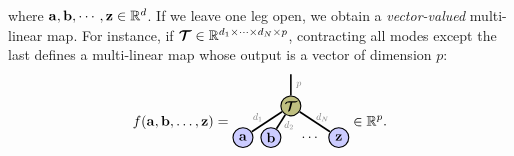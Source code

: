 where $\ab, \bb,\cdots,\zb\in\RR^d$.
If we leave one leg open, we obtain a \emph{vector-valued} multi-linear map. For instance, if $\Tt\in\RR^{d_1\times\cdots\times d_N \times p}$, contracting all modes except the last defines a multi-linear map whose output is a vector of dimension $p$:
$$
f(\ab,\bb,\dots,\zb)
=
\begin{tikzpicture}[baseline=2ex]
    \tikzset{tensor/.style = {minimum size = 0.5cm,shape = circle,thick,draw=black,inner sep = 0pt},
             edge/.style   = {thick,line width=.4mm},
             every loop/.style={}}
    \def\x{0}\def\y{0}

    \node[tensor,fill=green!50!red!50!white] (T) at (\x,\y+0.8){$\Tt$};

    \node[tensor,fill=blue!20!white] (a) at (\x-1.2,\y){$\ab$};
    \node[tensor,fill=blue!20!white] (b) at (\x-0.5,\y){$\bb$};
    \node[draw=none] (dots) at (\x+0.5,\y){$\cdots$};
    \node[tensor,fill=blue!20!white] (z) at (\x+1.2,\y){$\zb$};

    \draw[edge] (T) -- (a) node [near end,above]{\scalebox{0.7}{\dimcolor{$d_1\ $}}};
    \draw[edge] (T) -- (b) node [near end,right]{\scalebox{0.7}{\dimcolor{$d_2$}}};
    \draw[edge] (T) -- (z) node [near end,above]{\scalebox{0.7}{\dimcolor{$d_N$}}};
    \draw[edge] (T) -- (\x,\y+1.6) node [midway,right]{\scalebox{0.7}{\dimcolor{$p$}}};
\end{tikzpicture}
\in\RR^p.
$$

